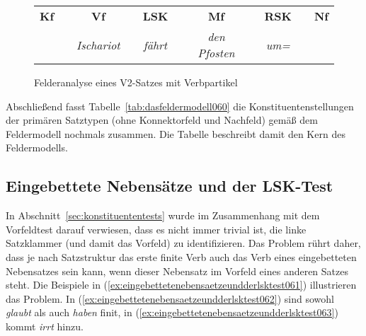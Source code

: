\begin{figure}[!htbp]
  \centering
  \begin{tabular}{cp{0.1em}cp{0.1em}cp{0.1em}cp{0.1em}cp{0.1em}c}
    \textbf{Kf} && \textbf{Vf} && \textbf{LSK} && \textbf{Mf} && \textbf{RSK} && \textbf{Nf} \\
    \cmidrule{1-1}\cmidrule{3-3}\cmidrule{5-5}\cmidrule{7-7}\cmidrule{9-9}\cmidrule{11-11}
    && \textit{Ischariot} && \textit{fährt} && \textit{den Pfosten} && \textit{um=} & \\
  \end{tabular}
  \caption{Felderanalyse eines V2-Satzes mit Verbpartikel}
  \label{fig:dasfeldermodell059}
\end{figure}

Abschließend fasst Tabelle~\ref{tab:dasfeldermodell060} die Konstituentenstellungen der primären Satztypen (ohne Konnektorfeld und Nachfeld) gemäß dem Feldermodell nochmals zusammen.
Die Tabelle beschreibt damit den Kern des Feldermodells.

\begin{table}
  \centering
  \caption{Besetzung der Felder in primären Satztypen laut Feldermodell}
  \label{tab:dasfeldermodell060}
\end{table}

\subsection{Eingebettete Nebensätze und der LSK-Test}
\label{sec:eingebettetenebensaetzeundderlsktest}

In Abschnitt~\ref{sec:konstituententests} wurde im Zusammenhang mit dem Vorfeldtest darauf verwiesen, dass es nicht immer trivial ist, die linke Satzklammer (und damit das Vorfeld) zu identifizieren.
Das Problem rührt daher, dass je nach Satzstruktur das erste finite Verb auch das Verb eines eingebetteten Nebensatzes sein kann, wenn dieser Nebensatz \zB im Vorfeld eines anderen Satzes steht.
Die Beispiele in (\ref{ex:eingebettetenebensaetzeundderlsktest061}) illustrieren das Problem.
In (\ref{ex:eingebettetenebensaetzeundderlsktest062}) sind sowohl \textit{glaubt} als auch \textit{haben} finit, in (\ref{ex:eingebettetenebensaetzeundderlsktest063}) kommt \textit{irrt} hinzu.

